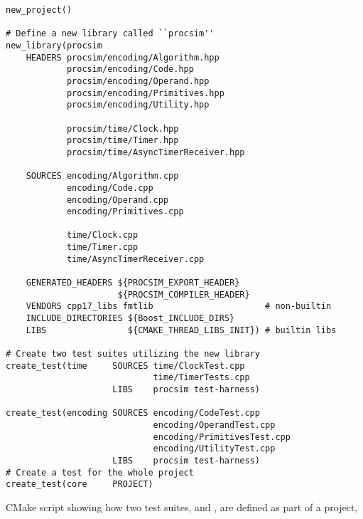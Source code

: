 \begin{listing}[hp]
\begin{verbatim}
new_project()

# Define a new library called ``procsim''
new_library(procsim 
    HEADERS procsim/encoding/Algorithm.hpp
            procsim/encoding/Code.hpp
            procsim/encoding/Operand.hpp
            procsim/encoding/Primitives.hpp
            procsim/encoding/Utility.hpp
            
            procsim/time/Clock.hpp
            procsim/time/Timer.hpp
            procsim/time/AsyncTimerReceiver.hpp
    
    SOURCES encoding/Algorithm.cpp
            encoding/Code.cpp
            encoding/Operand.cpp
            encoding/Primitives.cpp
    
            time/Clock.cpp
            time/Timer.cpp
            time/AsyncTimerReceiver.cpp
    
    GENERATED_HEADERS ${PROCSIM_EXPORT_HEADER}
                      ${PROCSIM_COMPILER_HEADER}
    VENDORS cpp17_libs fmtlib                      # non-builtin
    INCLUDE_DIRECTORIES ${Boost_INCLUDE_DIRS}
    LIBS                ${CMAKE_THREAD_LIBS_INIT}) # builtin libs

# Create two test suites utilizing the new library      
create_test(time     SOURCES time/ClockTest.cpp 
                             time/TimerTests.cpp
                     LIBS    procsim test-harness)
                     
create_test(encoding SOURCES encoding/CodeTest.cpp
                             encoding/OperandTest.cpp
                             encoding/PrimitivesTest.cpp
                             encoding/UtilityTest.cpp
                     LIBS    procsim test-harness)
# Create a test for the whole project
create_test(core     PROJECT)
\end{verbatim}
\caption{CMake script showing how two test suites,  and , are defined as part of a project, }
\label{lst:lua:cmake-test-declaration}
\end{listing}
 
